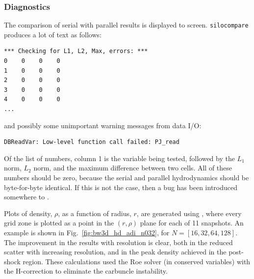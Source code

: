 \documentclass[a4paper,11pt]{report}
\begin{document}
\subsubsection{Diagnostics}

The comparison of serial with parallel results is displayed to screen.
\lstinline|silocompare| produces a lot of text as follows:
\begin{verbatim}
*** Checking for L1, L2, Max, errors: ***
0    0    0    0
1    0    0    0
2    0    0    0
3    0    0    0
4    0    0    0
...
\end{verbatim}
and possibly some unimportant warning messages from data I/O:
\begin{verbatim}
DBReadVar: Low-level function call failed: PJ_read
\end{verbatim}
Of the list of numbers, column 1 is the variable being tested, followed by the $L_1$ norm, $L_2$ norm, and the maximum difference between two cells.
All of these numbers should be zero, because the serial and parallel hydrodynamics should be byte-for-byte identical.
If this is not the case, then a bug has been introduced somewhere to \pion{}.

Plots of density, $\rho$, as a function of radius, $r$, are generated using \visit{}, where every grid zone is plotted as a point in the $(r,\rho)$ plane for each of 11 snapshots.
An example is shown in Fig.~\ref{fig:bw3d_hd_adi_n032}, for $N=[16,32,64,128]$.
The improvement in the results with resolution is clear, both in the reduced scatter with increasing resolution, and in the peak density achieved in the post-shock region.
These calculations used the Roe solver (in conserved variables) with the H-correction to eliminate the carbuncle instability.
\end{document}
